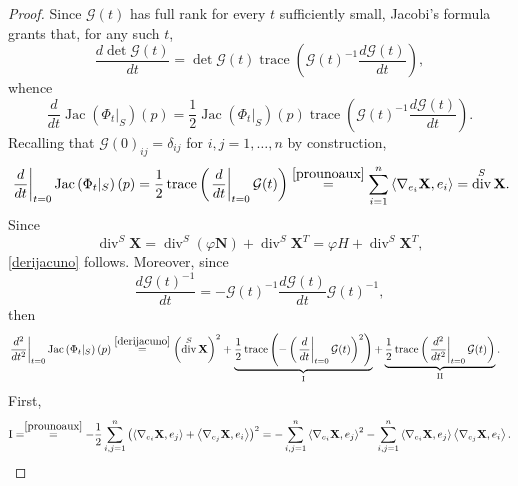 \documentclass[11pt]{amsart}
\newcommand{\n}[1]{\nabla^\varepsilon_{ #1 }}
\newcommand{\X}{\mathbf{X}}
\renewcommand{\n}{\mathbf{N}}
\newcommand{\G}{\mathcal G}
\DeclareMathOperator{\divv}{div}
\DeclareMathOperator{\trace}{trace}
\DeclareMathOperator{\jac}{Jac}
\theoremstyle{definition}
\theoremstyle{remark}
\numberwithin{equation}{section}
\begin{document}
\begin{proof}
    Since $\G(t)$ has full rank for every $t$ sufficiently small, Jacobi's formula grants that, for any such $t$,
    \begin{equation*}
        \frac{d \det \G(t)}{d t}=\det\G(t)\trace\left(\G(t)^{-1}\frac{d \G(t)}{dt}\right), 
    \end{equation*}
    whence
    \begin{equation*}
          \frac{d}{dt}\jac\left(\Phi_t|_{S}\right)\left(p\right)=\frac{1}{2}\jac\left(\Phi_t|_{S}\right)\left(p\right)\trace\left(\G(t)^{-1}\frac{d \G(t)}{dt}\right).
    \end{equation*}
   Recalling that $\G(0)_{ij}=\delta_{ij}$ for $i,j=1,\ldots,n$ by construction,
    \begin{align*}
         \left. \frac{d}{dt}\right|_{t=0}\jac\left(\Phi_t|_{S}\right)\left(p\right)=\frac{1}{2}\trace\left(\left.\frac{d }{dt}\right|_{t=0}\G(t)\right)\overset{\eqref{prounoaux}}{=}\sum_{i=1}^n\left\langle \nabla_{e_i}\X,e_i\right\rangle=\divv^S\X.
    \end{align*}
    Since 
    \begin{equation*}
        \divv^S\X=\divv^S\left(\varphi\n\right)+\divv^S\X^T=\varphi H+\divv^S\X^T,
    \end{equation*}
    \eqref{derijacuno} follows. Moreover, since \begin{equation}\label{derivatadimatriceinversa}
        \frac{d\G(t)^{-1}}{dt}=-\G(t)^{-1}\frac{d\G(t)}{dt}\G(t)^{-1},
    \end{equation}
    then
    \begin{equation*}
        \begin{split}
             \left. \frac{d^2}{dt^2}\right|_{t=0}\jac\left(\Phi_t|_{S}\right)\left(p\right)&\overset{\eqref{derijacuno}}{=}\left(\divv^S\X\right)^2+\underbrace{\frac{1}{2}\trace\left(-\left(\left.\frac{d }{dt}\right|_{t=0}\G(t)\right)^2\right)}_{\mathrm{I}}+\underbrace{\frac{1}{2}\trace\left(\left.\frac{d^2 }{dt^2}\right|_{t=0}\G(t)\right)}_{\mathrm{II}}.
        \end{split}
    \end{equation*}
    First,
    \begin{equation*}
        \begin{split}
            \mathrm{I}=
            \overset{\eqref{prounoaux}}{=}-\frac{1}{2}\sum_{i,j=1}^n\left(\left\langle\nabla_{e_i}\X,e_j\right\rangle+\left\langle \nabla_{e_j}\X,e_i\right\rangle\right)^2=-\sum_{i,j=1}^n\left\langle\nabla_{e_i}\X,e_j\right\rangle^2-\sum_{i,j=1}^n\left\langle\nabla_{e_i}\X,e_j\right\rangle\left\langle \nabla_{e_j}\X,e_i\right\rangle.

\end{split}
\end{equation*}
\end{proof}
\end{document}
